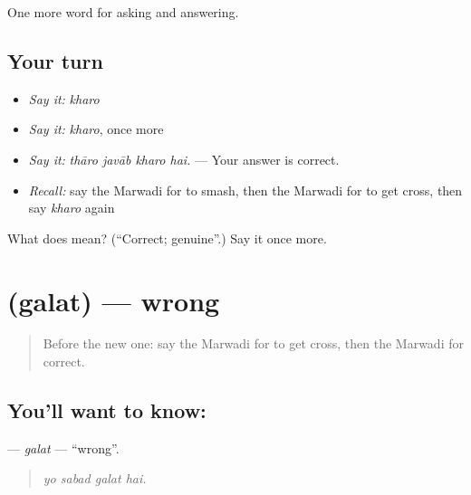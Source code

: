 \begin{grammarlens}[title={What you've built}]
One more word for asking and answering.
\end{grammarlens}

\subsection*{Your turn}
\begin{itemize}
\raggedright
  \item \emph{Say it:} \emph{kharo}
  \item \emph{Say it:} \emph{kharo}, once more
  \item \emph{Say it:} \emph{thāro javāb kharo hai.} — Your answer is correct.
  \item \emph{Recall:} say the Marwadi for to smash, then the Marwadi for to get cross, then say \emph{kharo} again
\end{itemize}

\begin{tcolorbox}[breakable,colback=teal!4,colframe=teal!35!black,title={Before you move on}]
What does  mean? (\textquotedblleft{}Correct; genuine\textquotedblright{}.) Say it once more.
\end{tcolorbox}
\section[\texorpdfstring{\mw{गलत} (galat)}{गलत (galat)}]{ (galat) — wrong}

\label{lesson:MW-C271-galat}



\begin{quote}
Before the new one: say the Marwadi for to get cross, then the Marwadi for correct.
\end{quote}

\subsection*{You'll want to know: }
\textbf{} — \emph{galat} — \textquotedblleft{}wrong\textquotedblright{}.

\begin{quote}
   
\end{quote}

\begin{quote}
\emph{yo sabad galat hai.}
\end{quote}

